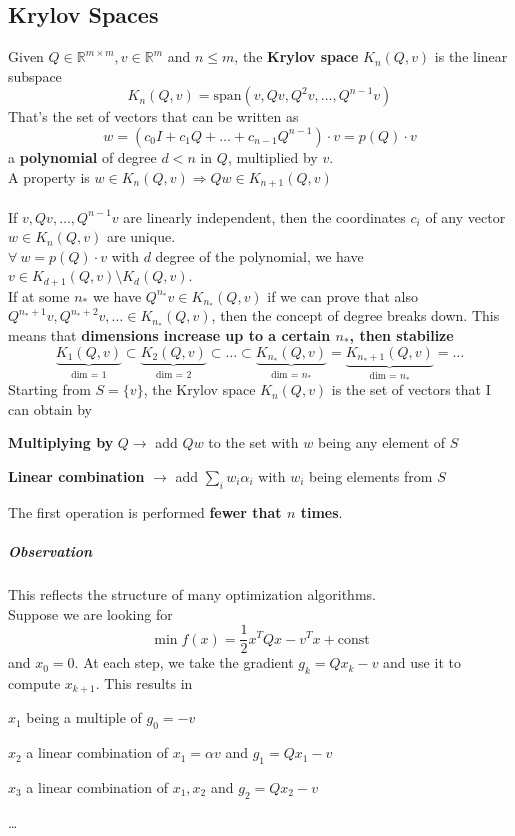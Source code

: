 \documentclass[10pt]{report}
\begin{document}
\subsection{Krylov Spaces}
Given $Q\in\mathbb{R}^{m\times m}, v\in\mathbb{R}^m$ and $n\leq m$, the \textbf{Krylov space} $K_n(Q,v)$ is the linear subspace $$K_n(Q,v) = \text{span}(v, Qv, Q^2v,\ldots, Q^{n-1}v)$$
That's the set of vectors that can be written as $$w = (c_0I+c_1Q+\ldots+c_{n-1}Q^{n-1})\cdot v=p(Q)\cdot v$$
a \textbf{polynomial} of degree $d<n$ in $Q$, multiplied by $v$.\\
A property is $w\in K_n(Q,v)\Rightarrow Qw\in K_{n+1}(Q, v)$\\\\
If $v, Qv,\ldots,Q^{n-1}v$ are linearly independent, then the coordinates $c_i$ of any vector $w\in K_n(Q,v)$ are unique.\\
$\forall\:w=p(Q)\cdot v$ with $d$ degree of the polynomial, we have $v\in K_{d+1}(Q,v)\setminus K_d(Q,v)$.\\
If at some $n_*$ we have $Q^{n_*}v \in K_{n_*}(Q,v)$ if we can prove that also $Q^{n_*+1}v, Q^{n_*+2}v,\ldots \in K_{n_*}(Q,v)$, then the concept of degree breaks down. This means that \textbf{dimensions increase up to a certain $n_*$, then stabilize}
$$\underset{\text{dim = 1}}{\underbrace{K_1(Q,v)}}\subset\underset{\text{dim = 2}}{\underbrace{K_2(Q,v)}}\subset\ldots\subset\underset{\text{dim = }n_*}{\underbrace{K_{n_*}(Q,v)}}=\underset{\text{dim = }n_*}{\underbrace{K_{n_*+1}(Q,v)}}=\ldots$$
Starting from $S=\{v\}$, the Krylov space $K_n(Q,v)$ is the set of vectors that I can obtain by\begin{list}{}{}
	\item \textbf{Multiplying by} $Q \rightarrow$ add $Qw$ to the set with $w$ being any element of $S$
	\item \textbf{Linear combination} $\rightarrow$ add $\sum_i w_i\alpha_i$ with $w_i$ being elements from $S$
\end{list}
The first operation is performed \textbf{fewer that $n$ times}.
\subparagraph{Observation} This reflects the structure of many optimization algorithms.\\
Suppose we are looking for $$\min f(x)=\frac{1}{2}x^TQx - v^Tx+\text{const}$$ and $x_0 = 0$. At each step, we take the gradient $g_k=Qx_k-v$ and use it to compute $x_{k+1}$. This results in\begin{list}{}{}
	\item $x_1$ being a multiple of $g_0 = -v$
	\item $x_2$ a linear combination of $x_1 = \alpha v$ and $g_1=Qx_1-v$
	\item $x_3$ a linear combination of $x_1, x_2$ and $g_2=Qx_2-v$
	\item \ldots
\end{list}
\end{document}
